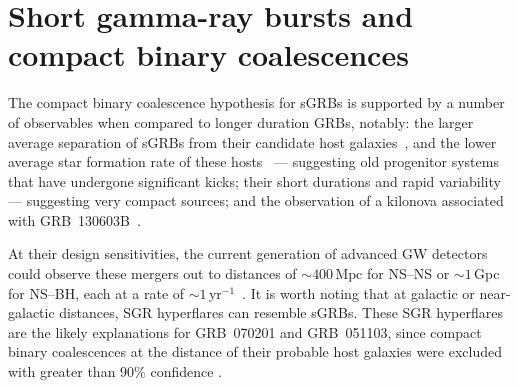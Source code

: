 \documentclass[twocolumn,nofootinbib]{revtex4-1}
\newcommand{\mpc}{\mathrm{Mpc}}
\newcommand{\BNS}{\ac{NS}--\ac{NS}\xspace}
\newcommand{\NSBH}{\ac{NS}--\ac{BH}\xspace}
\begin{document}
\section{Short gamma-ray bursts and compact binary coalescences}
\label{sec:sgrbs}
The compact binary coalescence hypothesis for \acp{sGRB} is supported
by a number of observables when compared to longer duration \acp{GRB}, notably:
the larger average separation of \acp{sGRB} from their candidate host
galaxies~\cite{Church:2011gk}, and the lower average star formation rate of
these hosts~\cite{Fong:2013eqa} --- suggesting old progenitor systems that
have undergone significant kicks;
their short durations and rapid variability~\cite{Rees:1994nw} --- suggesting
very compact sources;
and the observation of a kilonova associated with
GRB~130603B~\cite{Berger:2013wna,Tanvir:2013pia}.

At their design sensitivities, the current generation of advanced
\ac{GW} detectors could observe these mergers out to distances of
$\sim 400\,\mpc$ for \BNS or $\sim 1\,$Gpc for \NSBH, each at a rate of
$\sim 1\,$yr$^{-1}$~\cite{Aasi:2013wya}.  It is worth noting that at
galactic or near-galactic distances, \ac{SGR} hyperflares can resemble
\acp{sGRB}.  These \ac{SGR} hyperflares are the likely explanations
for GRB~070201 and GRB~051103, since compact binary coalescences at
the distance of their probable host galaxies were excluded with
greater than $90\%$ confidence \cite{Abbott:2007rh,Abadie:2012bz}.
\end{document}
